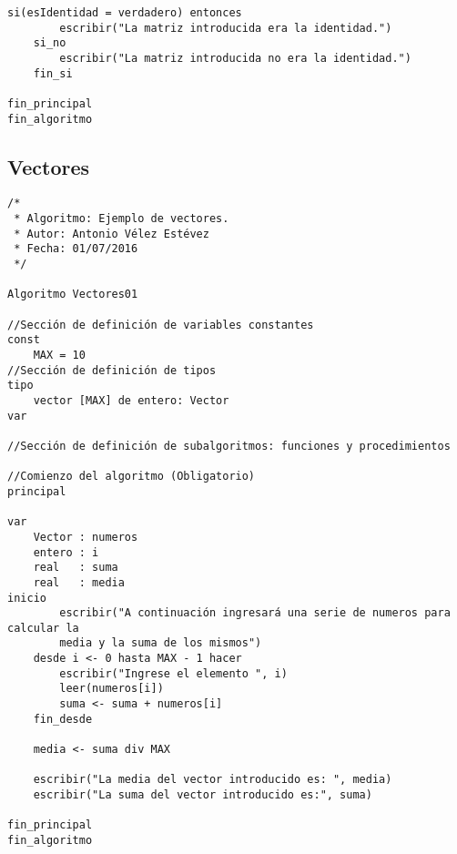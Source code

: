 \documentclass{article}
\begin{document}
\begin{appendices}
\begin{lstlisting}[language = pseudocodigoesp]
	si(esIdentidad = verdadero) entonces
		escribir("La matriz introducida era la identidad.")
	si_no
		escribir("La matriz introducida no era la identidad.")
	fin_si
	
fin_principal
fin_algoritmo
\end{lstlisting}
\subsection{Vectores}
  \begin{lstlisting}[language = pseudocodigoesp]
/*
 * Algoritmo: Ejemplo de vectores.
 * Autor: Antonio Vélez Estévez
 * Fecha: 01/07/2016
 */
 
Algoritmo Vectores01

//Sección de definición de variables constantes
const 
	MAX = 10
//Sección de definición de tipos
tipo
	vector [MAX] de entero: Vector
var

//Sección de definición de subalgoritmos: funciones y procedimientos	

//Comienzo del algoritmo (Obligatorio)
principal	

var
	Vector : numeros
	entero : i
	real   : suma
	real   : media
inicio 	
        escribir("A continuación ingresará una serie de numeros para calcular la
        media y la suma de los mismos")
	desde i <- 0 hasta MAX - 1 hacer
		escribir("Ingrese el elemento ", i)
		leer(numeros[i])
		suma <- suma + numeros[i]
	fin_desde
	
	media <- suma div MAX
	
	escribir("La media del vector introducido es: ", media)
	escribir("La suma del vector introducido es:", suma)
	
fin_principal
fin_algoritmo
  \end{lstlisting}
\end{appendices}
\end{document}
